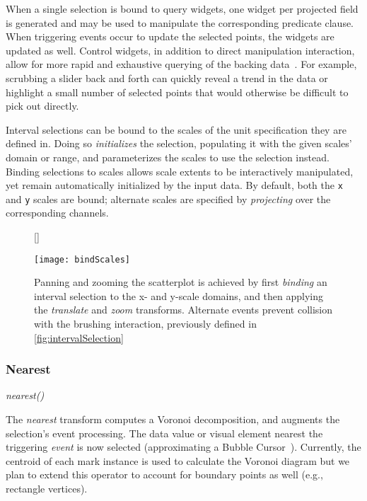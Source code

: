 When a single selection is bound to query widgets, one widget per projected
field is generated and may be used to manipulate the corresponding predicate
clause. When triggering events occur to update the selected points, the widgets
are updated as well. Control widgets, in addition to direct manipulation
interaction, allow for more rapid and exhaustive querying of the backing
data~\cite{shneiderman:dynamicqueries}. For example, scrubbing a slider back and
forth can quickly reveal a trend in the data or highlight a small number of
selected points that would otherwise be difficult to pick out directly.

Interval selections can be bound to the scales of the unit specification they
are defined in. Doing so \emph{initializes} the selection, populating it with
the given scales' domain or range, and parameterizes the scales to use the
selection instead. Binding selections to scales allows scale extents to be
interactively manipulated, yet remain automatically initialized by the input
data. By default, both the \texttt{x} and \texttt{y} scales are bound; alternate
scales are specified by \emph{projecting} over the corresponding channels.

\begin{figure}[h!]
[\FBwidth]
{\caption{Panning and zooming the scatterplot is achieved by first
\emph{binding} an interval selection to the x- and y-scale domains, and then
applying the \emph{translate} and \emph{zoom} transforms. Alternate events
prevent collision with the brushing interaction, previously defined in
\cref{fig:intervalSelection}}\label{fig:bindScales}}
{\texttt{[image: bindScales]}}
\end{figure}

\subsubsection{Nearest}

\centerline{\emph{nearest()}}

The \emph{nearest} transform computes a Voronoi decomposition, and augments the
selection's event processing. The data value or visual element nearest the
triggering \emph{event} is now selected (approximating a Bubble
Cursor~\cite{grossman:bubble}). Currently, the centroid of each mark instance is
used to calculate the Voronoi diagram but we plan to extend this operator to
account for boundary points as well (e.g., rectangle vertices).


